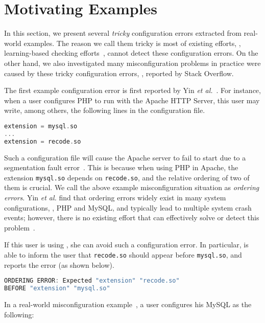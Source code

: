 \section{Motivating Examples}
\label{sec-motiv}

In this section, we present several {\em tricky} configuration errors
extracted from real-world examples. 
The reason we call them tricky is
most of existing efforts, \eg, learning-based checking
efforts~\cite{zhang14encore, wang04automatic}, cannot detect
these configuration errors.
On the other hand, we also investigated 
many misconfiguration problems in practice were caused by 
these tricky configuration errors, \eg, reported by Stack Overflow.

The first example configuration error is first reported by 
Yin {\em et al.}~\cite{yin11anempirical}.
For instance, when a user configures PHP to run with the
Apache HTTP Server, this user may write, among others, 
the following lines in the configuration file.

\begin{lstlisting}[language=C]
extension = mysql.so
...
extension = recode.so
\end{lstlisting} 

Such a configuration file will cause the Apache server to 
fail to start due to a segmentation fault error~\cite{yin11anempirical}. 
This is because when using PHP in Apache, the extension {\tt mysql.so} 
depends on {\tt recode.so}, and the relative ordering of two of them 
is crucial. 
We call the above example misconfiguration situation 
as {\em ordering errors}.
Yin {\em et al.} find that ordering errors widely exist in
many system configurations, \eg, PHP and MySQL,
and typically lead to multiple system crash events;
however, there is no existing effort that can effectively solve 
or detect this problem~\cite{zhang14encore, xu15systems, xu13do}.

If this user is using \app, she can avoid such a configuration error.
In particular, \app is able to inform the user that {\tt recode.so} 
should appear before {\tt mysql.so}, and reports the error (as shown
below).

\begin{lstlisting}[language=C]
ORDERING ERROR: Expected "extension" "recode.so"
BEFORE "extension" "mysql.so"
\end{lstlisting} 

In a real-world misconfiguration example~\cite{correlation}, 
a user configures his MySQL as the following:

